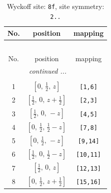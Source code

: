 \documentclass[fleqn,8pt]{jsarticle}
\begin{document}
\begin{longtable}{ccc}
\caption{Wyckoff site: {\tt 8f}, site symmetry: {\tt 2..}}
 \\
 \hline \hline
No. & position & mapping \\ \hline \endfirsthead

\multicolumn{2}{l}{\tablename\ \thetable{}} \\
 \hline \hline
No. & position & mapping \\ \hline \endhead

 \hline \hline
\multicolumn{2}{r}{\footnotesize\it continued ...} \\ \endfoot

 \hline \hline
\multicolumn{2}{r}{} \\ \endlastfoot

1 & $\left[ 0,\, \frac{1}{2},\, z \right]$ & {\tt [1,6]} \\ \hline
2 & $\left[ \frac{1}{2},\, 0,\, z + \frac{1}{2} \right]$ & {\tt [2,3]} \\ \hline
3 & $\left[ \frac{1}{2},\, 0,\, - z \right]$ & {\tt [4,5]} \\ \hline
4 & $\left[ 0,\, \frac{1}{2},\, \frac{1}{2} - z \right]$ & {\tt [7,8]} \\ \hline
5 & $\left[ 0,\, \frac{1}{2},\, - z \right]$ & {\tt [9,14]} \\ \hline
6 & $\left[ \frac{1}{2},\, 0,\, \frac{1}{2} - z \right]$ & {\tt [10,11]} \\ \hline
7 & $\left[ \frac{1}{2},\, 0,\, z \right]$ & {\tt [12,13]} \\ \hline
8 & $\left[ 0,\, \frac{1}{2},\, z + \frac{1}{2} \right]$ & {\tt [15,16]} \\
\end{longtable}
\renewcommand{\arraystretch}{1.2}
\end{document}
